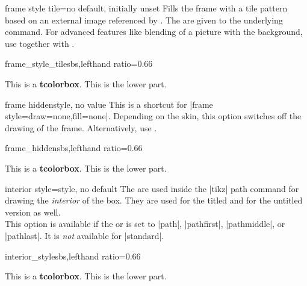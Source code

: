 \clearpage
\begin{docTcbKey}{frame style tile}{=}{no default, initially unset}
  Fills the frame with a tile pattern based on an external image referenced by .
  The  are given to the underlying  command.
  For advanced features like blending of a picture with the background,
  use  together with .
\begin{exdispExample*}{frame_style_tile}{sbs,lefthand ratio=0.66}

\begin{tcolorbox}[enhanced,title=My title,
  frame style tile={width=1cm}{pink_marble.png}]
This is a \textbf{tcolorbox}.
\tcblower
This is the lower part.
\end{tcolorbox}
\end{exdispExample*}
\end{docTcbKey}


\begin{docTcbKey}{frame hidden}{}{style, no value}
  This is a shortcut for |frame style={draw=none,fill=none}|.
  Depending on the skin, this option switches off the drawing of the
  frame.
  Alternatively, use .
\begin{exdispExample*}{frame_hidden}{sbs,lefthand ratio=0.66}

\begin{tcolorbox}[enhanced,title=My title,
  frame hidden]
This is a \textbf{tcolorbox}.
\tcblower
This is the lower part.
\end{tcolorbox}
\end{exdispExample*}
\end{docTcbKey}


\begin{docTcbKey}{interior style}{=}{style, no default}
  The  are used inside the |tikz| path command
  for drawing the \emph{interior} of the box. They are used for the titled
  and for the untitled version as well.\\
  This option is available if the 
  or  is set to
  |path|, |pathfirst|, |pathmiddle|, or |pathlast|.
  It is \emph{not} available for |standard|.
\begin{exdispExample*}{interior_style}{sbs,lefthand ratio=0.66}

\begin{tcolorbox}[enhanced,title=My title,
  interior style={left color=red!20!white,
                  right color=yellow!50!white}]
This is a \textbf{tcolorbox}.
\tcblower
This is the lower part.
\end{tcolorbox}
\end{exdispExample*}
\end{docTcbKey}

